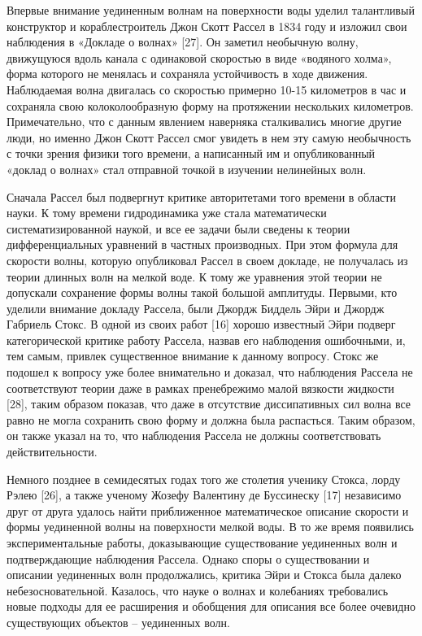 Впервые внимание уединенным волнам на поверхности воды уделил талантливый конструктор и кораблестроитель Джон Скотт Рассел в 1834 году и изложил свои наблюдения в «Докладе о волнах» [27]. Он заметил необычную волну, движущуюся вдоль канала с одинаковой скоростью в виде «водяного холма», форма которого не менялась и сохраняла устойчивость в ходе движения. Наблюдаемая волна двигалась со скоростью примерно 10-15 километров в час и сохраняла свою колоколообразную форму на протяжении нескольких километров. Примечательно, что с данным явлением наверняка сталкивались многие другие люди, но именно Джон Скотт Рассел смог увидеть в нем эту самую необычность с точки зрения физики того времени, а написанный им и опубликованный «доклад о волнах» стал отправной точкой в изучении нелинейных волн. 

Сначала Рассел был подвергнут критике авторитетами того времени в области науки. К тому времени гидродинамика уже стала математически систематизированной наукой, и все ее задачи были сведены к теории дифференциальных уравнений в частных производных. При этом формула для скорости волны, которую опубликовал Рассел в своем докладе, не получалась из теории длинных волн на мелкой воде. К тому же уравнения этой теории не допускали сохранение формы волны такой большой амплитуды. Первыми, кто уделили внимание докладу Рассела, были Джордж Биддель Эйри и Джордж Габриель Стокс. В одной из своих работ [16] хорошо известный Эйри подверг категорической критике работу Рассела, назвав его наблюдения ошибочными, и, тем самым, привлек существенное внимание к данному вопросу. Стокс же подошел к вопросу уже более внимательно и доказал, что наблюдения Рассела не соответствуют теории даже в рамках пренебрежимо малой вязкости жидкости [28], таким образом показав, что даже в отсутствие диссипативных сил волна все равно не могла сохранить свою форму и должна была распасться. Таким образом, он также указал на то, что наблюдения Рассела не должны соответствовать действительности.

Немного позднее в семидесятых годах того же столетия ученику Стокса, лорду Рэлею [26], а также ученому Жозефу Валентину де Буссинеску [17] независимо друг от друга удалось найти приближенное математическое описание скорости и формы уединенной волны на поверхности мелкой воды. В то же время появились экспериментальные работы, доказывающие существование уединенных волн и подтверждающие наблюдения Рассела. Однако споры о существовании и описании уединенных волн продолжались, критика Эйри и Стокса была далеко небезосновательной. Казалось, что науке о волнах и колебаниях требовались новые подходы для ее расширения и обобщения для описания все более очевидно существующих объектов – уединенных волн.

